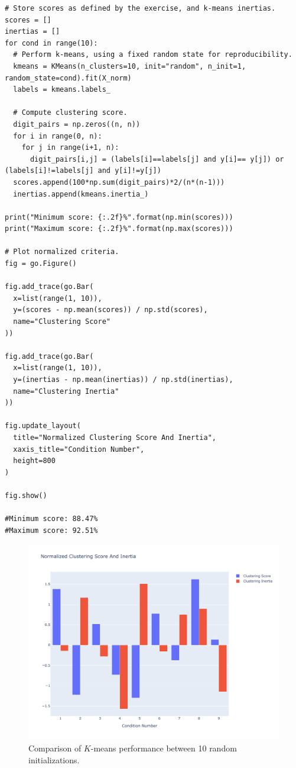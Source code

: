\documentclass[12pt]{article}
\begin{document}
  \begin{lstlisting}[caption={Perform $K$-means clustering and compare
    performance between random initializations.}, captionpos=b,
    label={lst:kmeans1}]
# Store scores as defined by the exercise, and k-means inertias.
scores = []
inertias = []
for cond in range(10):
  # Perform k-means, using a fixed random state for reproducibility.
  kmeans = KMeans(n_clusters=10, init="random", n_init=1, random_state=cond).fit(X_norm)
  labels = kmeans.labels_
  
  # Compute clustering score.
  digit_pairs = np.zeros((n, n))
  for i in range(0, n):
    for j in range(i+1, n):
      digit_pairs[i,j] = (labels[i]==labels[j] and y[i]== y[j]) or (labels[i]!=labels[j] and y[i]!=y[j])
  scores.append(100*np.sum(digit_pairs)*2/(n*(n-1))) 
  inertias.append(kmeans.inertia_)

print("Minimum score: {:.2f}%".format(np.min(scores)))
print("Maximum score: {:.2f}%".format(np.max(scores)))

# Plot normalized criteria.
fig = go.Figure()

fig.add_trace(go.Bar(
  x=list(range(1, 10)),
  y=(scores - np.mean(scores)) / np.std(scores),
  name="Clustering Score"
))

fig.add_trace(go.Bar(
  x=list(range(1, 10)),
  y=(inertias - np.mean(inertias)) / np.std(inertias),
  name="Clustering Inertia"
))

fig.update_layout(
  title="Normalized Clustering Score And Inertia",
  xaxis_title="Condition Number",
  height=800
)

fig.show()

#Minimum score: 88.47%
#Maximum score: 92.51%
  \end{lstlisting}

  \begin{figure}[!ht]
    \centering
    \includegraphics[width=\textwidth]{figures/kmeans1}
    \caption{Comparison of $K$-means performance between 10 random
      initializations.}%
    \label{fig:kmeans1}
  \end{figure} 
\end{document}
